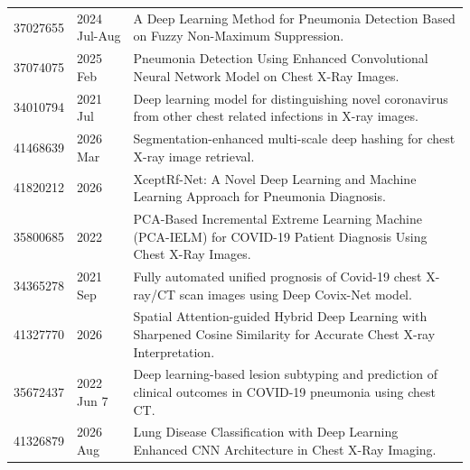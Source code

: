 \begin{longtable}{llp{9.5cm}}
37027655 & 2024 Jul-Aug & A Deep Learning Method for Pneumonia Detection Based on Fuzzy Non-Maximum Suppression. \\
37074075 & 2025 Feb & Pneumonia Detection Using Enhanced Convolutional Neural Network Model on Chest X-Ray Images. \\
34010794 & 2021 Jul & Deep learning model for distinguishing novel coronavirus from other chest related infections in X-ray images. \\
41468639 & 2026 Mar & Segmentation-enhanced multi-scale deep hashing for chest X-ray image retrieval. \\
41820212 & 2026 & XceptRf-Net: A Novel Deep Learning and Machine Learning Approach for Pneumonia Diagnosis. \\
35800685 & 2022 & PCA-Based Incremental Extreme Learning Machine (PCA-IELM) for COVID-19 Patient Diagnosis Using Chest X-Ray Images. \\
34365278 & 2021 Sep & Fully automated unified prognosis of Covid-19 chest X-ray/CT scan images using Deep Covix-Net model. \\
41327770 & 2026 & Spatial Attention-guided Hybrid Deep Learning with Sharpened Cosine Similarity for Accurate Chest X-ray Interpretation. \\
35672437 & 2022 Jun 7 & Deep learning-based lesion subtyping and prediction of clinical outcomes in COVID-19 pneumonia using chest CT. \\
41326879 & 2026 Aug & Lung Disease Classification with Deep Learning Enhanced CNN Architecture in Chest X-Ray Imaging. \\
\hline
\end{longtable}
